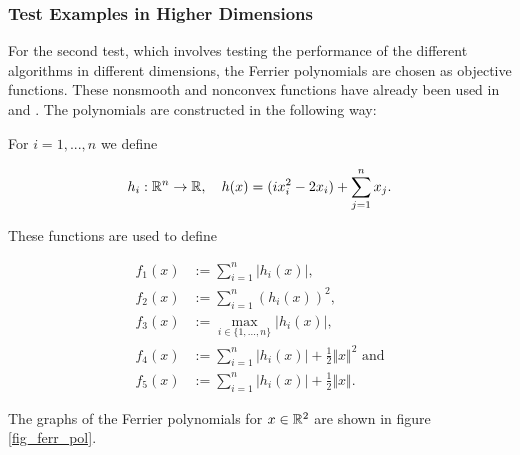 \subsubsection{Test Examples in Higher Dimensions}
\label{sec_num_test_ferr}

For the second test, which involves testing the performance of the different algorithms in different dimensions, the Ferrier polynomials are chosen as objective functions. These nonsmooth and nonconvex functions have already been used in \cite{Hare2010} and \cite{Hare2016}. The polynomials are constructed in the following way:

For \(i = 1,...,n\) we define 

\begin{align*}
	h_i: \mathbb{R}^n \to \mathbb{R}, \quad h(x) = (ix_i^2-2x_i)+\sum_{j=1}^n x_j.
\end{align*}

These functions are used to define

\begin{align*}
	f_1(x) &:= \sum_{i=1}^n |h_i(x)|, \\
	f_2(x) &:= \sum_{i=1}^n (h_i(x))^2, \\
	f_3(x) &:= \max_{i \in \{1,...,n\}}|h_i(x)|, \\
	f_4(x) &:= \sum_{i=1}^n \vert h_i(x)\vert+\frac{1}{2}\Vert x\Vert^2 \text{ and} \\
	f_5(x) &:= \sum_{i=1}^n \vert h_i(x)\vert+\frac{1}{2}\Vert x\Vert.
\end{align*}


The graphs of the Ferrier polynomials for \(x \in \mathbb{R}^2\) are shown in figure \ref{fig_ferr_pol}.

